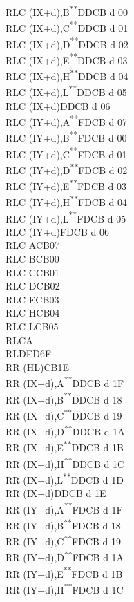 \documentclass[12pt,twoside,openright,a4paper]{book}
\newcommand{\UNDOC}{\textnormal{\textsuperscript{**}}}
\begin{document}
\begin{multicols}{3}
{\begin{tabbing}
	RLC (IX+d),B\UNDOC\>DDCB d 00\\
	RLC (IX+d),C\UNDOC\>DDCB d 01\\
	RLC (IX+d),D\UNDOC\>DDCB d 02\\
	RLC (IX+d),E\UNDOC\>DDCB d 03\\
	RLC (IX+d),H\UNDOC\>DDCB d 04\\
	RLC (IX+d),L\UNDOC\>DDCB d 05\\
	RLC (IX+d)\>DDCB d 06\\
	RLC (IY+d),A\UNDOC\>FDCB d 07\\
	RLC (IY+d),B\UNDOC\>FDCB d 00\\
	RLC (IY+d),C\UNDOC\>FDCB d 01\\
	RLC (IY+d),D\UNDOC\>FDCB d 02\\
	RLC (IY+d),E\UNDOC\>FDCB d 03\\
	RLC (IY+d),H\UNDOC\>FDCB d 04\\
	RLC (IY+d),L\UNDOC\>FDCB d 05\\
	RLC (IY+d)\>FDCB d 06\\
	RLC A\>CB07\\
	RLC B\>CB00\\
	RLC C\>CB01\\
	RLC D\>CB02\\
	RLC E\>CB03\\
	RLC H\>CB04\\
	RLC L\>CB05\\
	RLCA\\
	RLD\>ED6F\\
	RR (HL)\>CB1E\\
	RR (IX+d),A\UNDOC\>DDCB d 1F\\
	RR (IX+d),B\UNDOC\>DDCB d 18\\
	RR (IX+d),C\UNDOC\>DDCB d 19\\
	RR (IX+d),D\UNDOC\>DDCB d 1A\\
	RR (IX+d),E\UNDOC\>DDCB d 1B\\
	RR (IX+d),H\UNDOC\>DDCB d 1C\\
	RR (IX+d),L\UNDOC\>DDCB d 1D\\
	RR (IX+d)\>DDCB d 1E\\
	RR (IY+d),A\UNDOC\>FDCB d 1F\\
	RR (IY+d),B\UNDOC\>FDCB d 18\\
	RR (IY+d),C\UNDOC\>FDCB d 19\\
	RR (IY+d),D\UNDOC\>FDCB d 1A\\
	RR (IY+d),E\UNDOC\>FDCB d 1B\\
	RR (IY+d),H\UNDOC\>FDCB d 1C\\

\end{tabbing}}
\end{multicols}
\end{document}
